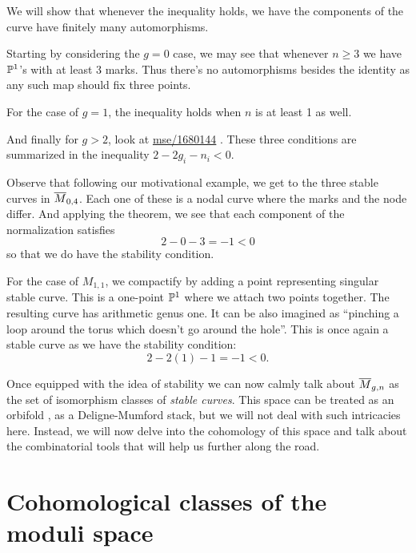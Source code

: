 \documentclass[12pt]{memoir}
\begin{document}
\begin{ptcb}
    We will show that whenever the inequality holds, we have the components of the curve have finitely many automorphisms.\par
    Starting by considering the $g=0$ case, we may see that whenever $n\geq 3$ we have $\mathbb{P}^1$'s with at least 3 marks. Thus there's no automorphisms besides the identity as any such map should fix three points.\par
    For the case of $g=1$, the inequality holds when $n$ is at least 1 as well. \par
    And finally for $g>2$, look at \href{https://math.stackexchange.com/questions/1680144/automorphism-group-of-genus-2-curve}{mse/1680144}
    .
    These three conditions are summarized in the inequality $2-2g_i-n_i<0$.
\end{ptcb}
\begin{Ex}
    Observe that following our motivational example, we get to the three stable curves in $\overline M_{0,4}$. Each one of these is a nodal curve where the marks and the node differ. And applying the theorem, we see that each component of the normalization satisfies
    $$2-0-3=-1<0$$
    so that we do have the stability condition. 
\end{Ex}

\begin{Ex}\label{ex-Mg1n1-compactification}
    For the case of $M_{1,1}$, we compactify by adding a point representing singular stable curve. This is a one-point $\mathbb{P}^1$ where we attach two points together. The resulting curve has arithmetic genus one. It can be also imagined as ``pinching a loop around the torus which doesn't go around the hole''. This is once again a stable curve as we have the stability condition:
    $$2-2(1)-1=-1<0.$$
\end{Ex}

Once equipped with the idea of stability we can now calmly talk about $\overline M_{g,n}$ as the set of isomorphism classes of \emph{stable curves}. This space can be treated as an orbifold \cite{ZvonkineIntro}, as a Deligne-Mumford stack, but we will not deal with such intricacies here. Instead, we will now delve into the cohomology of this space and talk about the combinatorial tools that will help us further along the road.

\section{Cohomological classes of the moduli space}
\end{document}
